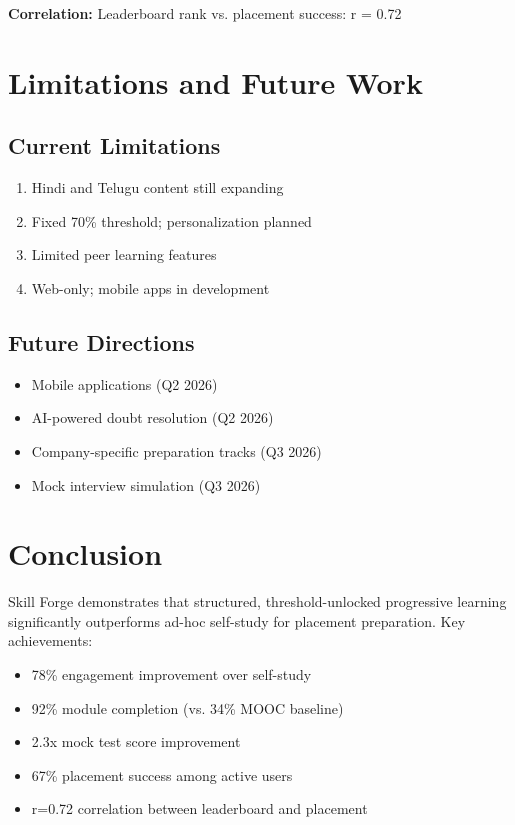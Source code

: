 \documentclass[conference]{IEEEtran}
\begin{document}
\textbf{Correlation:} Leaderboard rank vs. placement success: r = 0.72

\section{Limitations and Future Work}

\subsection{Current Limitations}

\begin{enumerate}
    \item Hindi and Telugu content still expanding
    \item Fixed 70\% threshold; personalization planned
    \item Limited peer learning features
    \item Web-only; mobile apps in development
\end{enumerate}

\subsection{Future Directions}

\begin{itemize}
    \item Mobile applications (Q2 2026)
    \item AI-powered doubt resolution (Q2 2026)
    \item Company-specific preparation tracks (Q3 2026)
    \item Mock interview simulation (Q3 2026)
\end{itemize}

\section{Conclusion}

Skill Forge demonstrates that structured, threshold-unlocked progressive learning significantly outperforms ad-hoc self-study for placement preparation. Key achievements:

\begin{itemize}
    \item 78\% engagement improvement over self-study
    \item 92\% module completion (vs. 34\% MOOC baseline)
    \item 2.3x mock test score improvement
    \item 67\% placement success among active users
    \item r=0.72 correlation between leaderboard and placement
\end{itemize}
\end{document}
